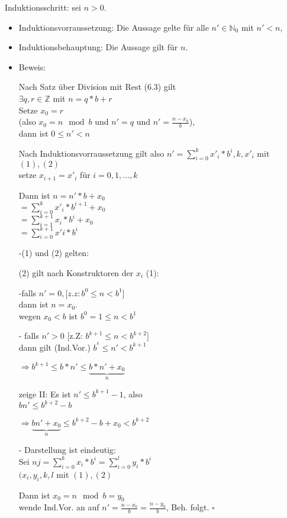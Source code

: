 \documentclass[a4paper, 12pt, twoside] {article}
\begin{document}
Induktionsschritt: sei $n > 0$.
\begin{itemize}

\item Induktionsvorraussetzung: Die Aussage gelte für alle $n' \in \mathbb{N}_0$ mit $n' < n$,

\item Induktionsbehauptung: Die Aussage gilt für $n$.


\item Beweis:

Nach Satz über Division mit Rest (6.3) gilt \\
$\exists q, r \in \mathbb{Z}$ mit $n = q*b + r$ \\
Setze $x_0 = r$ \\
(also $x_0 = n \mod b$ und $n' = q$ und $n' = \frac{n-x_0}{b}$), \\
dann ist $0 \leq n' < n$

Nach Induktionsvorraussetzung gilt also $n' = \displaystyle\sum_{i=0}^k x'_i * b^i, k, x'_i$ mit $(1), (2)$ \\
setze $x_{i+1} = x'_i$ für $i = 0, 1, ..., k$

Dann ist $n = n'*b + x_0$ \\
$=\displaystyle\sum_{i=0}^{k} x'_i*b^{i+1} + x_0$ \\
$=\displaystyle\sum_{i=1}^{k+1} x_i * b^i + x_0$ \\
$=\displaystyle\sum_{i=0}^{k+1} x'i * b^i$

-(1) und (2) gelten:

(2) gilt nach Konstruktoren der $x_i$ \/
(1):

-falls $n' = 0, [z.z: b^0 \leq n < b^1$] \\
dann ist $n = x_0$. \\
wegen $x_0 < b$ ist $b^0 = 1 \leq n < b^1$

- falls $n'>0$ [z.Z: $b^{k+1} \leq n < b^{k+2}]$ \\
dann gilt (Ind.Vor.) $b^^k \leq n' < b^{k+1}$

$\Rightarrow b^{k+1} \leq b*n' \leq \underbrace{b*n' + x_0}_{n}$

zeige II: Es ist $n' \leq b^{k+1} - 1$, also \\
$b n' \leq b^{k+2} - b$

$\Rightarrow \underbrace{b n' + x_0}_{n} \leq b^{k+2} - b + x_0 < b^{k+2}$

- Darstellung ist eindeutig: \\
Sei $nj = \displaystyle\sum_{i=0}^{k} x_i* b^i = \displaystyle\sum_{i=0}^{l} y_i * b^i$ \\
$(x_i, y_i, k, l$ mit $(1), (2)$

Dann ist $x_0 = n \mod b = y_0$ \\
wende Ind.Vor. an auf $n' = \frac{n-x_0}{b} = \frac{n-y_0}{b}$, Beh. folgt. \hfill $\square$

\end{itemize}
\end{document}
